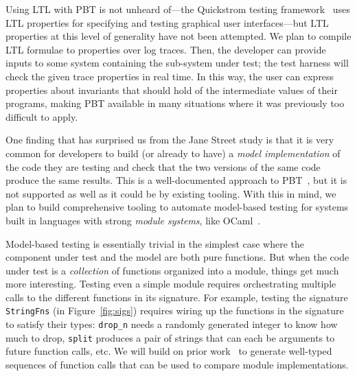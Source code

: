 Using LTL with PBT is not unheard of---the Quickstrom testing
framework~\cite{oconnor_quickstrom_2022} uses LTL properties
for specifying and testing graphical user interfaces---but LTL
properties at this level of generality have not been attempted. We plan to
compile LTL formulae to properties over log traces. Then, the
developer can provide inputs to some system containing the sub-system under
test; the test harness will check the given trace properties in real
time. In this
way, the user can express properties about invariants that should hold of the
intermediate values of their programs, making PBT available in many
situations where it was previously too difficult to apply.  

One finding that has surprised us from the Jane Street study is that
it is {very} common for developers to build (or already to have) a
{\em model
implementation} of the code they are testing and check that the two versions of
the same code produce the same results.  This is a well-documented approach to
PBT~\cite{hughes_experiences_2016}, but it is not supported as well as it could
be by existing tooling.
%
With this in mind, we plan to build comprehensive tooling to automate
model-based testing for systems built in languages with strong {\em
  module systems}, like OCaml~\cite{macqueen_modules_1984}.

Model-based testing is essentially trivial in the simplest case where
the component under test and the model are both pure functions.  But
when the code under test is a {\em
  collection} of functions
organized into a module, things get much more interesting. Testing even a simple
module requires orchestrating multiple calls to the different functions in
its signature. For example, testing the signature \lstinline{StringFns} (in
Figure~\ref{fig:sigs}) requires wiring up the functions in the
signature to satisfy their types: \lstinline{drop_n} needs a randomly generated
integer to know how much to drop, \lstinline{split} produces a pair of strings
that can each be arguments to future function calls, etc. We will build on prior
work~\cite{hughes_experiences_2016} to generate well-typed sequences of function
calls that can be used to compare module implementations. 


